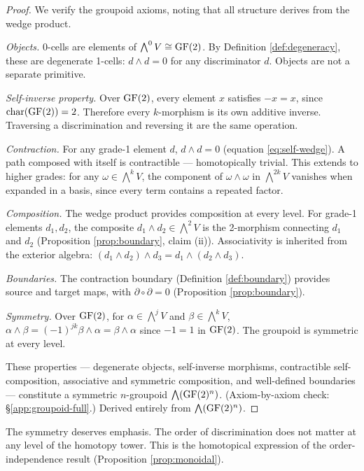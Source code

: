 \begin{proof}
We verify the groupoid axioms, noting that all structure
derives from the wedge product.

\emph{Objects.} 0-cells are elements of $\bigwedge^0 V \cong
\operatorname{GF}(2)$. By Definition \ref{def:degeneracy}, these are
degenerate 1-cells: $d \wedge d = 0$ for any discriminator $d$.
Objects are not a separate primitive.

\emph{Self-inverse property.} Over $\operatorname{GF}(2)$, every element $x$
satisfies $-x = x$, since $\operatorname{char}(\operatorname{GF}(2)) = 2$.
Therefore every $k$-morphism is its own additive inverse.
Traversing a discrimination and reversing it are the same
operation.

\emph{Contraction.} For any grade-1 element $d$,
$d \wedge d = 0$ (equation \ref{eq:self-wedge}). A path
composed with itself is contractible --- homotopically trivial.
This extends to higher grades: for any $\omega \in \bigwedge^k V$,
the component of $\omega \wedge \omega$ in $\bigwedge^{2k} V$
vanishes when expanded in a basis, since every term contains
a repeated factor.

\emph{Composition.} The wedge product provides composition at
every level. For grade-1 elements $d_1, d_2$, the composite
$d_1 \wedge d_2 \in \bigwedge^2 V$ is the 2-morphism
connecting $d_1$ and $d_2$ (Proposition \ref{prop:boundary},
claim (ii)). Associativity is inherited from the exterior
algebra:
$(d_1 \wedge d_2) \wedge d_3 = d_1 \wedge (d_2 \wedge d_3)$.

\emph{Boundaries.} The contraction boundary
(Definition \ref{def:boundary}) provides source and target maps,
with $\partial \circ \partial = 0$
(Proposition \ref{prop:boundary}).

\emph{Symmetry.} Over $\operatorname{GF}(2)$, for $\alpha \in \bigwedge^j V$
and $\beta \in \bigwedge^k V$,
$\alpha \wedge \beta = (-1)^{jk} \beta \wedge \alpha
= \beta \wedge \alpha$ since $-1 = 1$ in $\operatorname{GF}(2)$. The
groupoid is symmetric at every level.

These properties --- degenerate objects, self-inverse
morphisms, contractible self-composition, associative and
symmetric composition, and well-defined boundaries ---
constitute a symmetric $n$-groupoid $\bigwedge(\operatorname{GF}(2)^n)$. (Axiom-by-axiom check: \S\ref{app:groupoid-full}.) Derived entirely from
$\bigwedge(\operatorname{GF}(2)^n)$.
\end{proof}

\begin{remark}
The symmetry deserves emphasis. The order of discrimination
does not matter at any level of the homotopy tower. This is
the homotopical expression of the order-independence result
(Proposition \ref{prop:monoidal}).
\end{remark}

